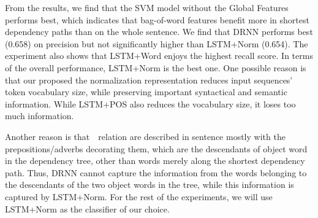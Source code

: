 From the results, we find that the SVM model without the Global Features performs best, which indicates that bag-of-word features benefit more in shortest dependency paths than on the whole sentence.
We find that DRNN performs best (0.658) on precision but not significantly higher than LSTM+Norm (0.654). 
The experiment also shows that LSTM+Word enjoys the highest recall score.
In terms of the overall performance, LSTM+Norm is the best one. 
One possible reason is that our proposed the normalization representation reduces input sequences' token vocabulary size, while preserving important syntactical and semantic information. While LSTM+POS also reduces the vocabulary size, it loses too much information. 

Another reason is that~\lnear\ relation are described in sentence mostly with the prepositions/adverbs decorating them, which are the descendants of object word in the dependency tree, other than words merely along the shortest dependency path. 
Thus, DRNN cannot capture the information from the words belonging to the descendants of the two object words in the tree, while this information is captured by LSTM+Norm. For the rest of the experiments, we will use LSTM+Norm as the classifier of our choice.



